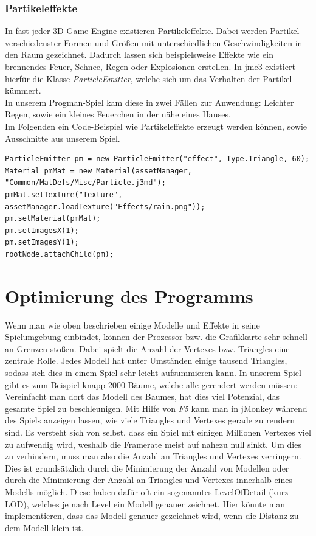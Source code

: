 \subsubsection{Partikeleffekte}
In fast jeder 3D-Game-Engine existieren Partikeleffekte. Dabei werden Partikel verschiedenster Formen und Größen mit unterschiedlichen Geschwindigkeiten in den Raum gezeichnet. Dadurch lassen sich beispielsweise Effekte wie ein brennendes Feuer, Schnee, Regen oder Explosionen erstellen. In jme3 existiert hierfür die Klasse \emph{ParticleEmitter}, welche sich um das Verhalten der Partikel kümmert.\\
In unserem Progman-Spiel kam diese in zwei Fällen zur Anwendung: Leichter Regen, sowie ein kleines Feuerchen in der nähe eines Hauses.\\ Im Folgenden ein Code-Beispiel wie Partikeleffekte erzeugt werden können, sowie Ausschnitte aus unserem Spiel.

\begin{lstlisting}
ParticleEmitter pm = new ParticleEmitter("effect", Type.Triangle, 60);
Material pmMat = new Material(assetManager, "Common/MatDefs/Misc/Particle.j3md");
pmMat.setTexture("Texture", assetManager.loadTexture("Effects/rain.png"));
pm.setMaterial(pmMat);
pm.setImagesX(1);
pm.setImagesY(1);
rootNode.attachChild(pm);
\end{lstlisting}


\section{Optimierung des Programms}\label{sec:optimizing}
Wenn man wie oben beschrieben einige Modelle und Effekte in seine Spielumgebung einbindet, können der Prozessor bzw. die Grafikkarte sehr schnell an Grenzen stoßen. Dabei spielt die Anzahl der Vertexes bzw. Triangles eine zentrale Rolle. Jedes Modell hat unter Umständen einige tausend Triangles, sodass sich dies in einem Spiel sehr leicht aufsummieren kann. In unserem Spiel gibt es zum Beispiel knapp 2000 Bäume, welche alle gerendert werden müssen: Vereinfacht man dort das Modell des Baumes, hat dies viel Potenzial, das gesamte Spiel zu beschleunigen. Mit Hilfe von \emph{F5} kann man in jMonkey während des Spiels anzeigen lassen, wie viele Triangles und Vertexes gerade zu rendern sind. Es versteht sich von selbst, dass ein Spiel mit einigen Millionen Vertexes viel zu aufwendig wird, weshalb die Framerate meist auf nahezu null sinkt. Um dies zu verhindern, muss man also die Anzahl an Triangles und Vertexes verringern. Dies ist grundsätzlich durch die Minimierung der Anzahl von Modellen oder durch die Minimierung der Anzahl an Triangles und Vertexes innerhalb eines Modells möglich. Diese haben dafür oft ein sogenanntes LevelOfDetail (kurz LOD), welches je nach Level ein Modell genauer zeichnet. Hier könnte man implementieren, dass das Modell genauer gezeichnet wird, wenn die Distanz zu dem Modell klein ist.


